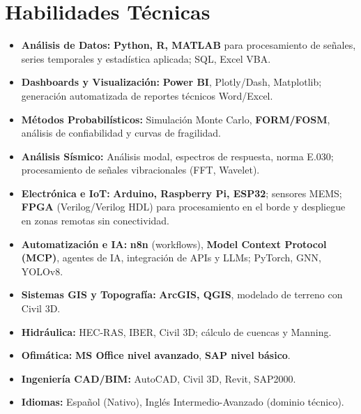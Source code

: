\documentclass[10pt, a4paper]{article}
\begin{document}
\section*{Habilidades Técnicas}
\begin{itemize}
    \item \textbf{Análisis de Datos:} \textbf{Python, R, MATLAB} para procesamiento de señales, series temporales y estadística aplicada; SQL, Excel VBA.
    \item \textbf{Dashboards y Visualización:} \textbf{Power BI}, Plotly/Dash, Matplotlib; generación automatizada de reportes técnicos Word/Excel.
    \item \textbf{Métodos Probabilísticos:} Simulación Monte Carlo, \textbf{FORM/FOSM}, análisis de confiabilidad y curvas de fragilidad.
    \item \textbf{Análisis Sísmico:} Análisis modal, espectros de respuesta, norma E.030; procesamiento de señales vibracionales (FFT, Wavelet).
    \item \textbf{Electrónica e IoT:} \textbf{Arduino, Raspberry Pi, ESP32}; sensores MEMS; \textbf{FPGA} (Verilog/Verilog HDL) para procesamiento en el borde y despliegue en zonas remotas sin conectividad.
    \item \textbf{Automatización e IA:} \textbf{n8n} (workflows), \textbf{Model Context Protocol (MCP)}, agentes de IA, integración de APIs y LLMs; PyTorch, GNN, YOLOv8.
    \item \textbf{Sistemas GIS y Topografía:} \textbf{ArcGIS, QGIS}, modelado de terreno con Civil 3D.
    \item \textbf{Hidráulica:} HEC-RAS, IBER, Civil 3D; cálculo de cuencas y Manning.
    \item \textbf{Ofimática:} \textbf{MS Office nivel avanzado}, \textbf{SAP nivel básico}.
    \item \textbf{Ingeniería CAD/BIM:} AutoCAD, Civil 3D, Revit, SAP2000.
    \item \textbf{Idiomas:} Español (Nativo), Inglés Intermedio-Avanzado (dominio técnico).
\end{itemize}

\end{document}
